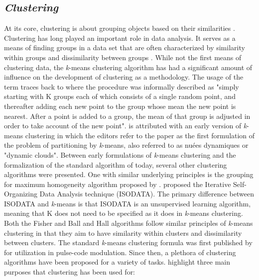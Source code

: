 \subsection{\textit{Clustering}} 

 

At its core, clustering is about grouping objects based on their similarities \citep{zhao_association_2003}. Clustering has long played an important role in data analysis. It serves as a means of finding groups in a data set that are often characterized by similarity within groups and dissimilarity between groups \citep{sinaga_unsupervised_2020}. While not the first means of clustering data, the \textit{k}-means clustering algorithm has had a significant amount of influence on the development of clustering as a methodology. The usage of the term traces back to \citet[283]{macqueen_methods_1967} where the procedure was informally described as "simply starting with K groups each of which consists of a single random point, and thereafter adding each new point to the group whose mean the new point is nearest. After a point is added to a group, the mean of that group is adjusted in order to take account of the new point". \citet{steinhaus_sur_1956} is attributed with an early version of \textit{k}-means clustering in which the editors refer to the paper as the first formulation of the problem of partitioning by \textit{k}-means, also referred to as nuées dynamiques or "dynamic clouds". Between early formulations of \textit{k}-means clustering and the formalization of the standard algorithm of today, several other clustering algorithms were presented. One with similar underlying principles is the grouping for maximum homogeneity algorithm proposed by \citep{fisher_grouping_1958}. \citet{ball_isodata_1965} proposed the Iterative Self-Organizing Data Analysis technique (ISODATA). The primary difference between ISODATA and \textit{k}-means is that ISODATA is an unsupervised learning algorithm, meaning that K does not need to be specified as it does in \textit{k}-means clustering. Both the Fisher and Ball and Hall algorithms follow similar principles of \textit{k}-means clustering in that they aim to have similarity within clusters and dissimilarity between clusters. The standard \textit{k}-means clustering formula was first published by \citet{lloyd_least_1982} for utilization in pulse-code modulation. Since then, a plethora of clustering algorithms have been proposed for a variety of tasks. \citet[653]{jain_data_2010} highlight three main purposes that clustering has been used for:  

